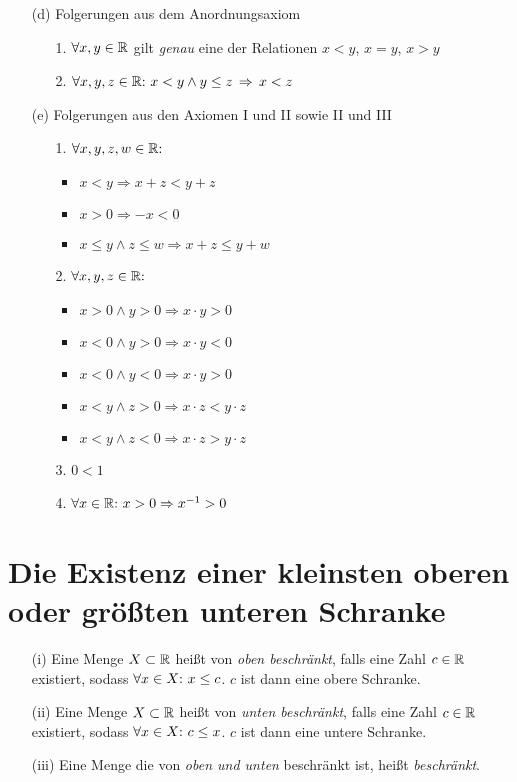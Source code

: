\begin{enumerate}
	\item[(d)] Folgerungen aus dem Anordnungsaxiom
	
	\begin{enumerate}
		\item[1.] $\forall x,y \in \mathbb{R}$ gilt \textit{genau} eine der Relationen $x<y$, $x=y$, $x>y$
		\item[2.] $\forall x,y,z \in \mathbb{R}{:}\  x<y \land y \leq z \,\Rightarrow\, x < z$
	\end{enumerate}
	
	\item[(e)] Folgerungen aus den Axiomen I und II sowie II und III
	
	\begin{enumerate}
		\item[1.] $\forall x,y,z,w \in \mathbb{R}{:}\ $
		\begin{itemize}
			\item $x<y \Rightarrow x+z < y+z$
			\item $x>0 \Rightarrow -x < 0$
			\item $x\leq y \land z \leq w \Rightarrow x+z \leq y+w$
		\end{itemize}
		\item[2.] $\forall x,y,z \in \mathbb{R}{:}\ $
		\begin{itemize}
			\item $x > 0 \land y > 0 \Rightarrow x\cdot y > 0$
			\item $x < 0 \land y > 0 \Rightarrow x\cdot y < 0$
			\item $x < 0 \land y < 0 \Rightarrow x\cdot y > 0$
			\item $x < y \land z > 0 \Rightarrow x\cdot z < y \cdot z$
			\item $x < y \land z < 0 \Rightarrow x\cdot z > y \cdot z$
		\end{itemize}
		\item[3.] $0<1$
		\item[4.] $\forall x \in \mathbb{R}{:}\  x > 0 \Rightarrow x^{-1} >0$
	\end{enumerate}
\end{enumerate}

\section{Die Existenz einer kleinsten oberen oder größten unteren Schranke}

\begin{frameddefn}
	\begin{enumerate}
		\item [(i)] Eine Menge $X \subset \mathbb{R}$ heißt von \textit{oben beschränkt}, falls eine Zahl $c \in \mathbb{R}$ existiert, sodass $\forall x \in X{:}\  x \leq c$. $c$ ist dann eine obere Schranke.
		\item [(ii)] Eine Menge $X \subset \mathbb{R}$ heißt von \textit{unten beschränkt}, falls eine Zahl $c \in \mathbb{R}$ existiert, sodass $\forall x \in X{:}\  c \leq x$. $c$ ist dann eine untere Schranke.
		\item [(iii)] Eine Menge die von \textit{oben und unten} beschränkt ist, heißt \textit{beschränkt}.
	\end{enumerate}
\end{frameddefn}

